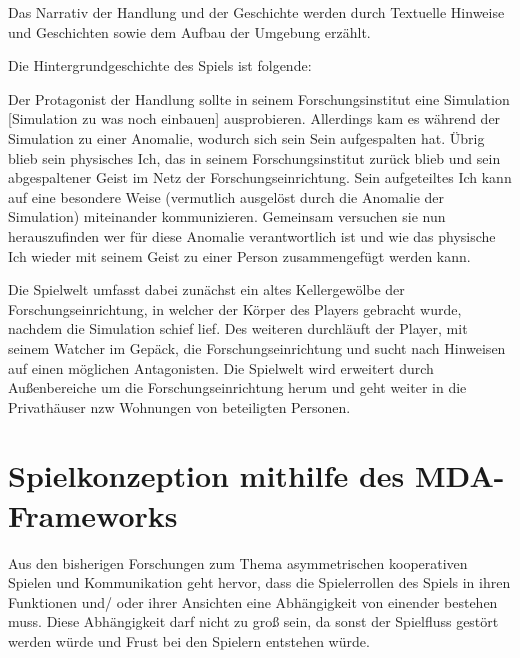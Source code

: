 Das Narrativ der Handlung und der Geschichte werden durch Textuelle Hinweise und Geschichten sowie dem Aufbau der Umgebung erzählt. 


Die Hintergrundgeschichte des Spiels ist folgende:

Der Protagonist der Handlung sollte in seinem Forschungsinstitut eine Simulation [Simulation zu was noch einbauen] ausprobieren. Allerdings kam es während der Simulation zu einer Anomalie, wodurch sich sein Sein aufgespalten hat. Übrig blieb sein physisches Ich, das in seinem Forschungsinstitut zurück blieb und sein abgespaltener Geist im Netz der Forschungseinrichtung. Sein aufgeteiltes Ich kann auf eine besondere Weise (vermutlich ausgelöst durch die Anomalie der Simulation) miteinander kommunizieren. Gemeinsam versuchen sie nun herauszufinden wer für diese Anomalie verantwortlich ist und wie das physische Ich wieder mit seinem Geist zu einer Person zusammengefügt werden kann.


Die Spielwelt umfasst dabei zunächst ein altes Kellergewölbe der Forschungseinrichtung, in welcher der Körper des Players gebracht wurde, nachdem die Simulation schief lief. Des weiteren durchläuft der Player, mit seinem Watcher im Gepäck, die Forschungseinrichtung und sucht nach Hinweisen auf einen möglichen Antagonisten. Die Spielwelt wird erweitert durch Außenbereiche um die Forschungseinrichtung herum und geht weiter in die Privathäuser nzw Wohnungen von beteiligten Personen.

\section{Spielkonzeption mithilfe des MDA-Frameworks}
Aus den bisherigen Forschungen zum Thema asymmetrischen kooperativen Spielen und Kommunikation geht hervor, dass die Spielerrollen des Spiels in ihren Funktionen und/ oder ihrer Ansichten eine Abhängigkeit von einender bestehen muss. Diese Abhängigkeit darf nicht zu groß sein, da sonst der Spielfluss gestört werden würde und Frust bei den Spielern entstehen würde. 

